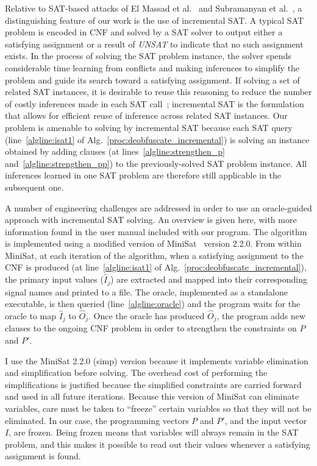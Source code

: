 \documentclass[thesis]{umassthesis}  %
\begin{document}
Relative to SAT-based attacks of El Massad et al.~\cite{elmassad-15} and Subramanyan et al.~\cite{subramanyan-15}, a distinguishing feature of our work is the use of incremental SAT. A typical SAT problem is encoded in CNF and solved by a SAT solver to output either a satisfying assignment or a result of \textit{UNSAT} to indicate that no such assignment exists. In the process of solving the SAT problem instance, the solver spends considerable time learning from conflicts and making inferences to simplify the problem and guide its search toward a satisfying assignment. If solving a set of related SAT instances, it is desirable to reuse this reasoning to reduce the number of costly inferences made in each SAT call~\cite{een2003temporal}; incremental SAT is the formulation that allows for efficient reuse of inference across related SAT instances. Our problem is amenable to solving by incremental SAT because each SAT query (line~\ref{algline:isat1} of Alg.~\ref{proc:deobfuscate_incremental}) is solving an instance obtained by adding clauses (at lines~\ref{algline:strengthen_p} and~\ref{algline:strengthen_pp}) to the previously-solved SAT problem instance. All inferences learned in one SAT problem are therefore still applicable in the subsequent one. 

A number of engineering challenges are addressed in order to use an oracle-guided approach with incremental SAT solving. An overview is given here, with more information found in the user manual included with our program. The algorithm is implemented using a modified version of MiniSat~\cite{een-04} version 2.2.0. From within MiniSat, at each iteration of the algorithm, when a satisfying assignment to the CNF is produced (at line~\ref{algline:isat1} of Alg.~\ref{proc:deobfuscate_incremental}), the primary input values ($\widehat{I}_j$) are extracted and mapped into their corresponding signal names and printed to a file. The oracle, implemented as a standalone executable, is then queried (line~\ref{algline:oracle}) and the program waits for the oracle to map $\widehat{I}_j$ to $\widehat{O}_j$. Once the oracle has produced $\widehat{O}_j$, the program adds new clauses to the ongoing CNF problem in order to strengthen the constraints on $P$ and $P'$.

I use the MiniSat 2.2.0 (simp) version because it implements variable elimination and simplification before solving. The overhead cost of performing the simplifications is justified because the simplified constraints are carried forward and used in all future iterations. Because this version of MiniSat can eliminate variables, care must be taken to ``freeze'' certain variables so that they will not be eliminated. In our case, the programming vectors $P$ and $P'$, and the input vector $I$, are frozen. Being frozen means that variables will always remain in the SAT problem, and this makes it possible to read out their values whenever a satisfying assignment is found.
\end{document}
